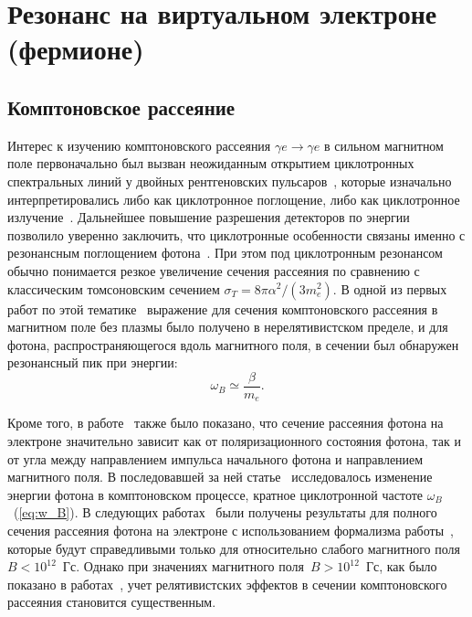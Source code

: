 \section{Резонанс на виртуальном электроне (фермионе)}
\subsection{Комптоновское рассеяние}
Интерес к изучению комптоновского рассеяния $\gamma e \to \gamma e$ в 
сильном магнитном поле первоначально был вызван неожиданным открытием циклотронных 
спектральных линий у двойных рентгеновских 
пульсаров~\cite{Truemper1978,Makishima1990,Grove1995}, которые изначально 
интерпретировались либо как циклотронное поглощение, либо как циклотронное 
излучение~\cite{Truemper1978}. Дальнейшее повышение разрешения детекторов по 
энергии позволило уверенно заключить, что циклотронные особенности связаны 
именно с резонансным поглощением фотона~\cite{Mihara:1990}.
При этом под циклотронным резонансом обычно понимается 
резкое увеличение сечения рассеяния по сравнению с классическим томсоновским 
сечением $\sigma_T = 8 \pi \alpha^2 /(3 m_e^2)$. В одной из первых 
работ по этой тематике~\cite{Canuto:1971} выражение для сечения 
комптоновского 
рассеяния в магнитном поле без плазмы было получено
в нерелятивистском пределе, и для фотона, 
распространяющегося вдоль магнитного поля, в сечении был обнаружен резонансный 
пик при энергии:
\begin{equation}\label{eq:w_B}
	\omega_B\simeq \frac{\beta}{m_e}.
\end{equation}
 
Кроме того, в работе~\cite{Canuto:1971} также было показано, что сечение рассеяния фотона 
на электроне
значительно зависит как от поляризационного состояния фотона, так и от угла 
между направлением импульса начального фотона и направлением магнитного поля. В 
последовавшей за ней 
статье~\cite{Gnedin1973} 
исследовалось изменение энергии фотона в комптоновском процессе, кратное 
циклотронной частоте $\omega_B$~(\ref{eq:w_B}). 
В следующих работах~\cite{Borner1979,Ventura:1979} 
были получены результаты для полного сечения рассеяния фотона на электроне с использованием формализма работы~\cite{Canuto:1971}, которые будут справедливыми только для относительно слабого магнитного поля~$B<10^{12}$~Гс. Однако при значениях магнитного поля~$B>10^{12}$~Гс, как было показано в работах~\cite{Herold:1979,Melrose:1983III},   учет релятивистских эффектов в сечении комптоновского рассеяния становится 
существенным.

